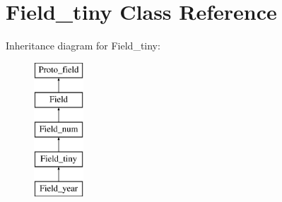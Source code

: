 \hypertarget{classField__tiny}{}\section{Field\+\_\+tiny Class Reference}
\label{classField__tiny}
Inheritance diagram for Field\+\_\+tiny\+:\begin{figure}[H]
\begin{center}
\leavevmode
\includegraphics[height=5.000000cm]{classField__tiny}
\end{center}
\end{figure}
